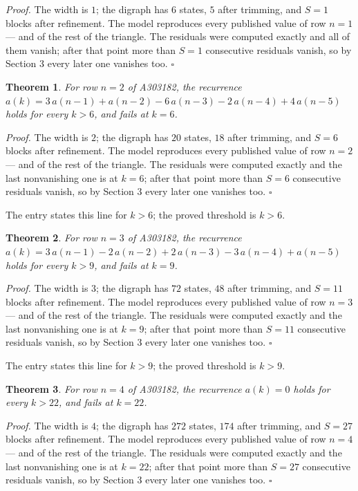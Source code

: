 \documentclass[11pt]{article}
\newtheorem{theorem}{Theorem}
\theoremstyle{definition}
\begin{document}
{\itshape Proof.} The width is $1$; the digraph has $6$ states, $5$ after trimming, and $S = 1$ blocks after refinement. The model reproduces every published value of row $n = 1$ --- and of the rest of the triangle. The residuals were computed exactly and all of them vanish; after that point more than $S = 1$ consecutive residuals vanish, so by Section 3 every later one vanishes too. $\square$

\begin{theorem} For row $n = 2$ of A303182, the recurrence $a(k) = 3\,a(n-1) + a(n-2) - 6\,a(n-3) - 2\,a(n-4) + 4\,a(n-5)$ holds for every $k > 6$, and fails at $k = 6$.\end{theorem}

{\itshape Proof.} The width is $2$; the digraph has $20$ states, $18$ after trimming, and $S = 6$ blocks after refinement. The model reproduces every published value of row $n = 2$ --- and of the rest of the triangle. The residuals were computed exactly and the last nonvanishing one is at $k = 6$; after that point more than $S = 6$ consecutive residuals vanish, so by Section 3 every later one vanishes too. $\square$

The entry states this line for $k > 6$; the proved threshold is $k > 6$.

\begin{theorem} For row $n = 3$ of A303182, the recurrence $a(k) = 3\,a(n-1) - 2\,a(n-2) + 2\,a(n-3) - 3\,a(n-4) + a(n-5)$ holds for every $k > 9$, and fails at $k = 9$.\end{theorem}

{\itshape Proof.} The width is $3$; the digraph has $72$ states, $48$ after trimming, and $S = 11$ blocks after refinement. The model reproduces every published value of row $n = 3$ --- and of the rest of the triangle. The residuals were computed exactly and the last nonvanishing one is at $k = 9$; after that point more than $S = 11$ consecutive residuals vanish, so by Section 3 every later one vanishes too. $\square$

The entry states this line for $k > 9$; the proved threshold is $k > 9$.

\begin{theorem} For row $n = 4$ of A303182, the recurrence $a(k) = 0$ holds for every $k > 22$, and fails at $k = 22$.\end{theorem}

{\itshape Proof.} The width is $4$; the digraph has $272$ states, $174$ after trimming, and $S = 27$ blocks after refinement. The model reproduces every published value of row $n = 4$ --- and of the rest of the triangle. The residuals were computed exactly and the last nonvanishing one is at $k = 22$; after that point more than $S = 27$ consecutive residuals vanish, so by Section 3 every later one vanishes too. $\square$
\end{document}
